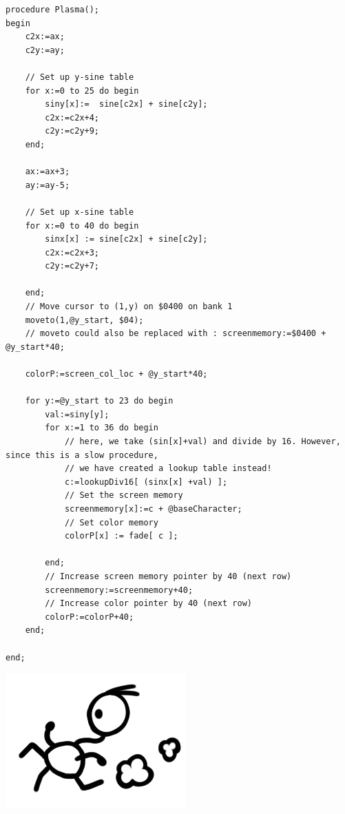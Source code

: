 \begin{minipage}{0.8\textwidth}
\begin{lstlisting}
procedure Plasma();
begin
	c2x:=ax;
	c2y:=ay;
	
	// Set up y-sine table
	for x:=0 to 25 do begin 
		siny[x]:=  sine[c2x] + sine[c2y];
		c2x:=c2x+4;
		c2y:=c2y+9;
	end;

	ax:=ax+3;
	ay:=ay-5;

	// Set up x-sine table
	for x:=0 to 40 do begin 
		sinx[x] := sine[c2x] + sine[c2y];
		c2x:=c2x+3;
		c2y:=c2y+7;

	end;
	// Move cursor to (1,y) on $0400 on bank 1
	moveto(1,@y_start, $04);
	// moveto could also be replaced with : screenmemory:=$0400 + @y_start*40;
	
	colorP:=screen_col_loc + @y_start*40;
	
	for y:=@y_start to 23 do begin
		val:=siny[y];
		for x:=1 to 36 do begin
			// here, we take (sin[x]+val) and divide by 16. However, since this is a slow procedure,
			// we have created a lookup table instead!
			c:=lookupDiv16[ (sinx[x] +val) ];
			// Set the screen memory
			screenmemory[x]:=c + @baseCharacter;
			// Set color memory
			colorP[x] := fade[ c ];

		end;
		// Increase screen memory pointer by 40 (next row)
		screenmemory:=screenmemory+40;
		// Increase color pointer by 40 (next row)
		colorP:=colorP+40;
	end;

end;
\end{lstlisting}
\end{minipage}

\begin{minipage}{0.2\textwidth}
\includegraphics[width=\linewidth]{images/trip/trip14.png}
\end{minipage}


